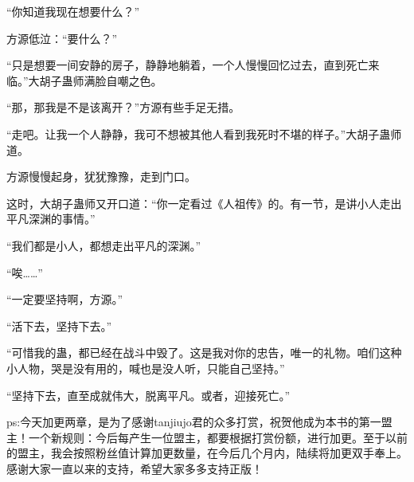 \begin{this_body}
“你知道我现在想要什么？”

方源低泣：“要什么？”

“只是想要一间安静的房子，静静地躺着，一个人慢慢回忆过去，直到死亡来临。”大胡子蛊师满脸自嘲之色。

“那，那我是不是该离开？”方源有些手足无措。

“走吧。让我一个人静静，我可不想被其他人看到我死时不堪的样子。”大胡子蛊师道。

方源慢慢起身，犹犹豫豫，走到门口。

这时，大胡子蛊师又开口道：“你一定看过《人祖传》的。有一节，是讲小人走出平凡深渊的事情。”

“我们都是小人，都想走出平凡的深渊。”

“唉……”

“一定要坚持啊，方源。”

“活下去，坚持下去。”

“可惜我的蛊，都已经在战斗中毁了。这是我对你的忠告，唯一的礼物。咱们这种小人物，哭是没有用的，喊也是没人听，只能自己坚持。”

“坚持下去，直至成就伟大，脱离平凡。或者，迎接死亡。”

ps:今天加更两章，是为了感谢tanjiujo君的众多打赏，祝贺他成为本书的第一盟主！一个新规则：今后每产生一位盟主，都要根据打赏份额，进行加更。至于以前的盟主，我会按照粉丝值计算加更数量，在今后几个月内，陆续将加更双手奉上。感谢大家一直以来的支持，希望大家多多支持正版！

\end{this_body}


